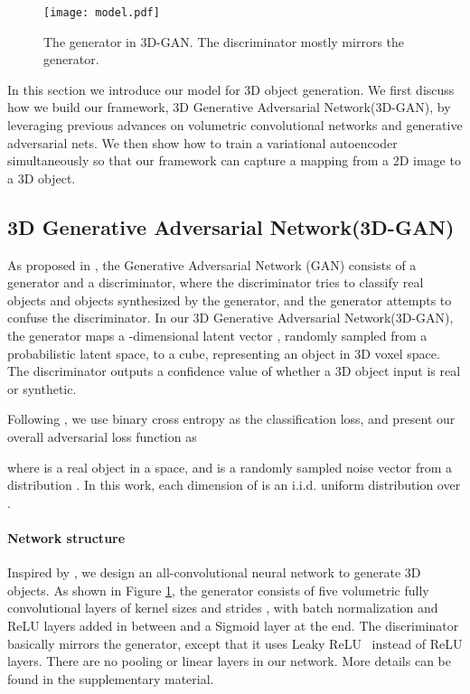 \documentclass{article}
\newcommand{\modelfull}{3D Generative Adversarial Network\xspace}
\newcommand{\model}{3D-GAN\xspace}
\newcommand{\myparagraph}[1]{\vspace{-10pt}\paragraph{#1}}
\newcommand{\presubsection}{\vspace{-8pt}}
\newcommand{\postsubsection}{\vspace{-6pt}}
\begin{document}
\begin{figure}[t]
\centering
\vspace{-5pt}
\texttt{[image: model.pdf]}
\vspace{-8pt}
\caption{The generator in \model. The discriminator mostly mirrors the generator. }
\vspace{-18pt}
\label{fig:model}
\end{figure}

In this section we introduce our model for 3D object generation. We first discuss how we build our framework, \modelfull (\model), by leveraging previous advances on volumetric convolutional networks and generative adversarial nets. We then show how to train a variational autoencoder~\citep{kingma2014auto} simultaneously so that our framework can capture a mapping from a 2D image to a 3D object. 

\presubsection
\subsection{\modelfull (\model)}
\label{sec:gan}
\postsubsection

As proposed in \cite{goodfellow2014generative}, the Generative Adversarial Network (GAN) consists of a generator and a discriminator, where the discriminator tries to classify real objects and objects synthesized by the generator, and the generator attempts to confuse the discriminator. In our \modelfull (\model), the generator  maps a -dimensional latent vector , randomly sampled from a probabilistic latent space, to a  cube, representing an object  in 3D voxel space. The discriminator  outputs a confidence value  of whether a 3D object input  is real or synthetic. 

Following \cite{goodfellow2014generative}, we use binary cross entropy as the classification loss, and present our overall adversarial loss function as 

\vspace{-10pt}

\vspace{-9pt}

where  is a real object in a  space, and  is a randomly sampled noise vector from a distribution . In this work, each dimension of  is an i.i.d. uniform distribution over . 

\myparagraph{Network structure} Inspired by \cite{radford2016unsupervised}, we design an all-convolutional neural network to generate 3D objects. As shown in Figure \ref{fig:model}, the generator consists of five volumetric fully convolutional layers of kernel sizes  and strides , with batch normalization and ReLU layers added in between and a Sigmoid layer at the end. The discriminator basically mirrors the generator, except that it uses Leaky ReLU~\citep{maas2013rectifier} instead of ReLU layers. 
There are no pooling or linear layers in our network. More details can be found in the supplementary material.
\end{document}
